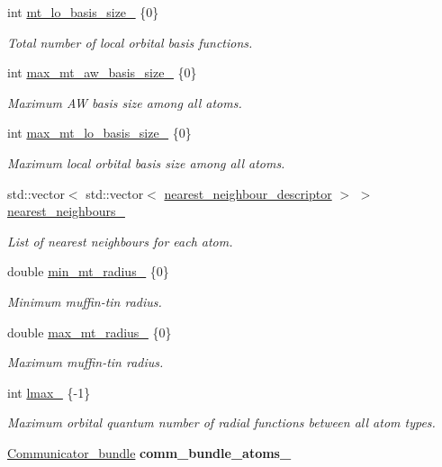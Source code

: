 \begin{DoxyCompactItemize}
\item 
int \hyperlink{classsirius_1_1_unit__cell_a64b9370ff27b0fdf91a035e61f025456}{mt\+\_\+lo\+\_\+basis\+\_\+size\+\_\+} \{0\}
\begin{DoxyCompactList}\small\item\em Total number of local orbital basis functions. \end{DoxyCompactList}\item 
int \hyperlink{classsirius_1_1_unit__cell_adfdf46843e5d5cb6eeb94b4e681f75ed}{max\+\_\+mt\+\_\+aw\+\_\+basis\+\_\+size\+\_\+} \{0\}
\begin{DoxyCompactList}\small\item\em Maximum A\+W basis size among all atoms. \end{DoxyCompactList}\item 
int \hyperlink{classsirius_1_1_unit__cell_af2da7ed61a428e6d5fdd239103ce9dc1}{max\+\_\+mt\+\_\+lo\+\_\+basis\+\_\+size\+\_\+} \{0\}
\begin{DoxyCompactList}\small\item\em Maximum local orbital basis size among all atoms. \end{DoxyCompactList}\item 
std\+::vector$<$ std\+::vector$<$ \hyperlink{structnearest__neighbour__descriptor}{nearest\+\_\+neighbour\+\_\+descriptor} $>$ $>$ \hyperlink{classsirius_1_1_unit__cell_a1d4fd34e939aac3561937c6307361ca3}{nearest\+\_\+neighbours\+\_\+}
\begin{DoxyCompactList}\small\item\em List of nearest neighbours for each atom. \end{DoxyCompactList}\item 
double \hyperlink{classsirius_1_1_unit__cell_a811f4365eb0377e75c2846c472e122df}{min\+\_\+mt\+\_\+radius\+\_\+} \{0\}
\begin{DoxyCompactList}\small\item\em Minimum muffin-\/tin radius. \end{DoxyCompactList}\item 
double \hyperlink{classsirius_1_1_unit__cell_a1f7acd5822d56a04d70fc56730e8959a}{max\+\_\+mt\+\_\+radius\+\_\+} \{0\}
\begin{DoxyCompactList}\small\item\em Maximum muffin-\/tin radius. \end{DoxyCompactList}\item 
int \hyperlink{classsirius_1_1_unit__cell_a622aa1eeb5b646e665194cbc6d7dc08c}{lmax\+\_\+} \{-\/1\}
\begin{DoxyCompactList}\small\item\em Maximum orbital quantum number of radial functions between all atom types. \end{DoxyCompactList}\item 
\hypertarget{classsirius_1_1_unit__cell_ae4414aa1fe26e48f75990baaf3403f32}{}\hyperlink{classsddk_1_1_communicator__bundle}{Communicator\+\_\+bundle} {\bfseries comm\+\_\+bundle\+\_\+atoms\+\_\+}\label{classsirius_1_1_unit__cell_ae4414aa1fe26e48f75990baaf3403f32}


\end{DoxyCompactItemize}
